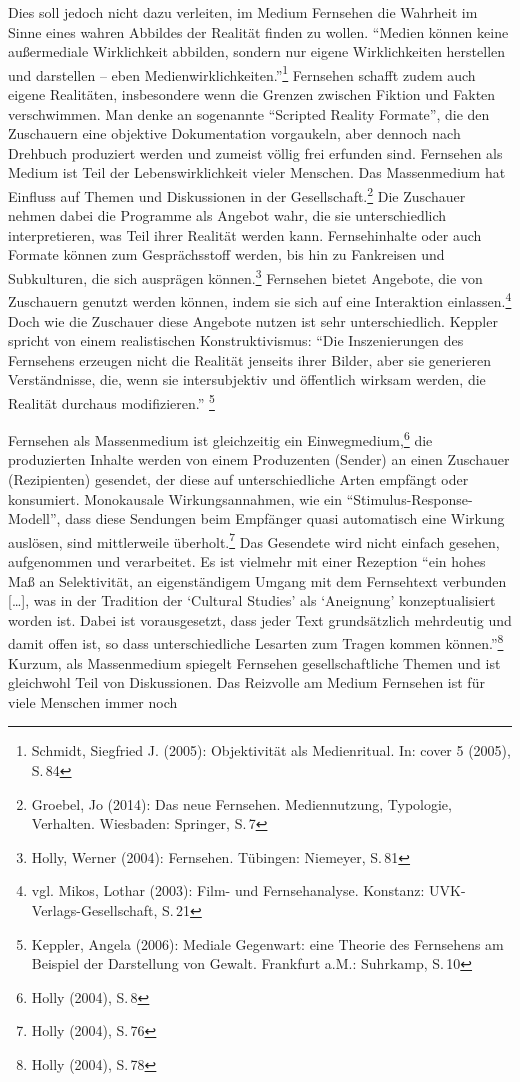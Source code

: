 Dies soll jedoch nicht dazu verleiten, im Medium Fernsehen die Wahrheit
im Sinne eines wahren Abbildes der Realität finden zu wollen.
\enquote{Medien können keine außermediale Wirklichkeit abbilden, sondern
nur eigene Wirklichkeiten herstellen und darstellen -- eben
Medienwirklichkeiten.}\footnote{Schmidt, Siegfried J. (2005):
  Objektivität als Medienritual. In: cover 5 (2005), S.\,84} Fernsehen
schafft zudem auch eigene Realitäten, insbesondere wenn die Grenzen
zwischen Fiktion und Fakten verschwimmen. Man denke an sogenannte
\enquote{Scripted Reality Formate}, die den Zuschauern eine objektive
Dokumentation vorgaukeln, aber dennoch nach Drehbuch produziert werden
und zumeist völlig frei erfunden sind. Fernsehen als Medium ist Teil der
Lebenswirklichkeit vieler Menschen. Das Massenmedium hat Einfluss auf
Themen und Diskussionen in der Gesellschaft.\footnote{Groebel, Jo
  (2014): Das neue Fernsehen. Mediennutzung, Typologie, Verhalten.
  Wiesbaden: Springer, S.\,7} Die Zuschauer nehmen dabei die Programme
als Angebot wahr, die sie unterschiedlich interpretieren, was Teil ihrer
Realität werden kann. Fernsehinhalte oder auch Formate können zum
Gesprächsstoff werden, bis hin zu Fankreisen und Subkulturen, die sich
ausprägen können.\footnote{Holly, Werner (2004): Fernsehen. Tübingen:
  Niemeyer, S.\,81} Fernsehen bietet Angebote, die von Zuschauern genutzt
werden können, indem sie sich auf eine Interaktion einlassen.\footnote{vgl.
  Mikos, Lothar (2003): Film- und Fernsehanalyse. Konstanz:
  UVK-Verlags-Gesellschaft, S.\,21} Doch wie die Zuschauer diese Angebote
nutzen ist sehr unterschiedlich. Keppler spricht von einem realistischen
Konstruktivismus: \enquote{Die Inszenierungen des Fernsehens erzeugen
nicht die Realität jenseits ihrer Bilder, aber sie generieren
Verständnisse, die, wenn sie intersubjektiv und öffentlich wirksam
werden, die Realität durchaus modifizieren.} \footnote{Keppler, Angela
  (2006): Mediale Gegenwart: eine Theorie des Fernsehens am Beispiel der
  Darstellung von Gewalt. Frankfurt a.M.: Suhrkamp, S.\,10}

Fernsehen als Massenmedium ist gleichzeitig ein Einwegmedium,\footnote{Holly
  (2004), S.\,8} die produzierten Inhalte werden von einem Produzenten
(Sender) an einen Zuschauer (Rezipienten) gesendet, der diese auf
unterschiedliche Arten empfängt oder konsumiert. Monokausale
Wirkungsannahmen, wie ein \enquote{Stimulus-Response-Modell}, dass diese
Sendungen beim Empfänger quasi automatisch eine Wirkung auslösen, sind
mittlerweile überholt.\footnote{Holly (2004), S.\,76} Das Gesendete wird
nicht einfach gesehen, aufgenommen und verarbeitet. Es ist vielmehr mit
einer Rezeption \enquote{ein hohes Maß an Selektivität, an
eigenständigem Umgang mit dem Fernsehtext verbunden {[}\ldots{}{]}, was
in der Tradition der \enquote{Cultural Studies} als \enquote{Aneignung}
konzeptualisiert worden ist. Dabei ist vorausgesetzt, dass jeder Text
grundsätzlich mehrdeutig und damit offen ist, so dass unterschiedliche
Lesarten zum Tragen kommen können.}\footnote{Holly (2004), S.\,78}
Kurzum, als Massenmedium spiegelt Fernsehen gesellschaftliche Themen und
ist gleichwohl Teil von Diskussionen. Das Reizvolle am Medium Fernsehen
ist für viele Menschen immer noch


